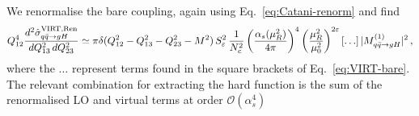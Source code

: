 We renormalise the bare coupling, again using Eq.~\eqref{eq:Catani-renorm} and find
\begin{equation}
\label{eq:virt-ren}
  Q_{12}^4\frac{d^2\hat\sigma_{q\bar{q}\to g H}^{\rm VIRT, Ren}}{dQ_{13}^2\,dQ_{23}^2} \simeq
  \pi\delta(Q_{12}^2-Q_{13}^2-Q_{23}^2-M^2)\,S_\varepsilon^2
  \,\frac{1}{N_c^2}
  \left(\frac{\alpha_s(\mu_R^2)}{4\pi}\right)^4  \left(\frac{\mu_R^2}{\mu_0^2}\right)^{2\varepsilon}\left[\ldots\right]|M^{(1)}_{q\bar{q}\to g H}|^2 \,,
\end{equation}
where the $\ldots$ represent terms found in the square brackets of Eq.~\eqref{eq:VIRT-bare}.
The relevant combination for extracting the hard function is the
sum of the renormalised LO and virtual terms at order $\mathcal{O}(\alpha_s^4)$

